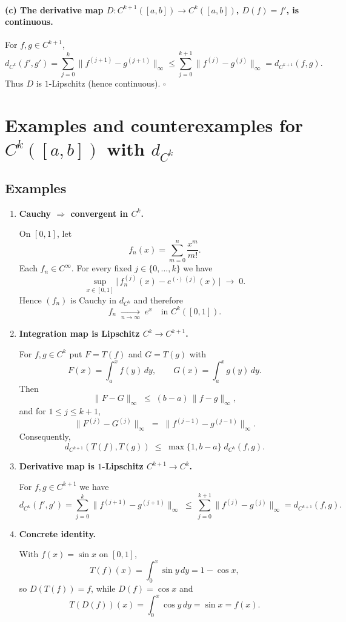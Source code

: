 \documentclass[12pt,a4paper]{article}
\newcommand{\qed}{\hfill$\square$}
\begin{document}
\paragraph{(c) The derivative map $D:C^{k+1}([a,b])\to C^k([a,b])$, $D(f)=f'$, is continuous.}
For $f,g\in C^{k+1}$,
\[
d_{C^k}(f',g')=\sum_{j=0}^k \|f^{(j+1)}-g^{(j+1)}\|_\infty
\le \sum_{j=0}^{k+1} \|f^{(j)}-g^{(j)}\|_\infty
= d_{C^{k+1}}(f,g).
\]
Thus $D$ is $1$-Lipschitz (hence continuous). \qed

	
\section*{Examples and counterexamples for $C^k([a,b])$ with $d_{C^k}$}

\subsection*{Examples}

\begin{enumerate}
	
	\item \textbf{Cauchy $\Rightarrow$ convergent in $C^k$.}
	
	On $[0,1]$, let
	\[
	f_n(x)=\sum_{m=0}^{n}\frac{x^{m}}{m!}.
	\]
	Each $f_n\in C^\infty$.  
	For every fixed $j\in\{0,\dots,k\}$ we have
	\[
	\sup_{x\in[0,1]}\bigl|\,f_n^{(j)}(x)-e^{(\cdot)\,(j)}(x)\,\bigr|\;\longrightarrow\;0.
	\]
	Hence $(f_n)$ is Cauchy in $d_{C^k}$ and therefore
	\[
	f_n \;\xrightarrow[n\to\infty]{}\; e^x \quad\text{in } C^k([0,1]).
	\]
	
	\medskip
	
	\item \textbf{Integration map is Lipschitz $C^k\!\to C^{k+1}$.}
	
	For $f,g\in C^k$ put $F=T(f)$ and $G=T(g)$ with
	\[
	F(x)=\int_a^x f(y)\,dy, \qquad G(x)=\int_a^x g(y)\,dy .
	\]
	Then
	\[
	\|F-G\|_\infty \;\le\; (b-a)\,\|f-g\|_\infty,
	\]
	and for $1\le j\le k+1$,
	\[
	\|F^{(j)}-G^{(j)}\|_\infty \;=\; \|f^{(j-1)}-g^{(j-1)}\|_\infty .
	\]
	Consequently,
	\[
	d_{C^{k+1}}(T(f),T(g))
	\;\le\; \max\{1,b-a\}\; d_{C^k}(f,g).
	\]
	
	\medskip
	
	\item \textbf{Derivative map is $1$-Lipschitz $C^{k+1}\!\to C^{k}$.}
	
	For $f,g\in C^{k+1}$ we have
	\[
	d_{C^{k}}(f',g')
	=\sum_{j=0}^{k} \|f^{(j+1)}-g^{(j+1)}\|_\infty
	\;\le\;
	\sum_{j=0}^{k+1} \|f^{(j)}-g^{(j)}\|_\infty
	= d_{C^{k+1}}(f,g).
	\]
	
	\medskip
	
	\item \textbf{Concrete identity.}
	
	With $f(x)=\sin x$ on $[0,1]$,
	\[
	T(f)(x)=\int_0^x\sin y\,dy = 1-\cos x,
	\]
	so $D(T(f))=f$, while $D(f)=\cos x$ and
	\[
	T(D(f))(x)=\int_0^x \cos y\,dy=\sin x=f(x).
	\]
	
\end{enumerate}
\end{document}
